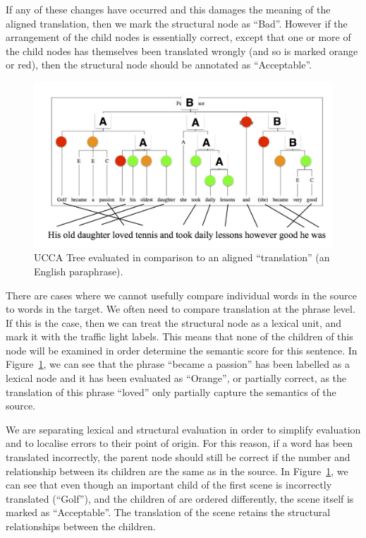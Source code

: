 \documentclass[11pt]{article}
\begin{document}
If any of these changes have occurred and this damages the meaning of the aligned translation, then we mark the 
structural node as ``Bad''. 
However if the arrangement of the child nodes is essentially correct, except that one or
more of the child nodes has themselves been translated wrongly (and so is marked
orange or red), then the structural node should be 
annotated as ``Acceptable''.

\begin{figure}[t]
    \includegraphics[width=1\textwidth]{ucca-tree-mteval}
    \caption{UCCA Tree evaluated in comparison to an aligned ``translation'' (an
	English paraphrase).}
    \label{ucca-tree-mteval}
\end{figure}


There are cases where we cannot usefully compare individual words in the source to words in the target.
We often need to compare translation at the phrase level. If this is the case, then we can 
 treat the structural node as a lexical unit, and mark it with the traffic light labels. This 
means that none of the children of this node will be examined in order determine the semantic score
for this sentence. 
In Figure~\ref{ucca-tree-mteval}, we can see that the phrase ``became a passion'' has been labelled as a lexical
node and it has been evaluated as ``Orange'', or partially correct, as the translation of this phrase ``loved'' 
only partially capture the semantics of the source.

We are separating lexical and structural evaluation in order to simplify evaluation and to localise errors
to their point of origin. For this reason, if a word has been translated incorrectly,
the parent node should still be correct if the number and relationship between its children are the same
as in the source. 
In Figure~\ref{ucca-tree-mteval}, we can see that even though an important child of the first scene is 
incorrectly translated (``Golf''), and the children of are ordered differently, 
the scene itself is marked as ``Acceptable''. The translation of the scene retains the structural 
relationships between the children.
\\
\end{document}
